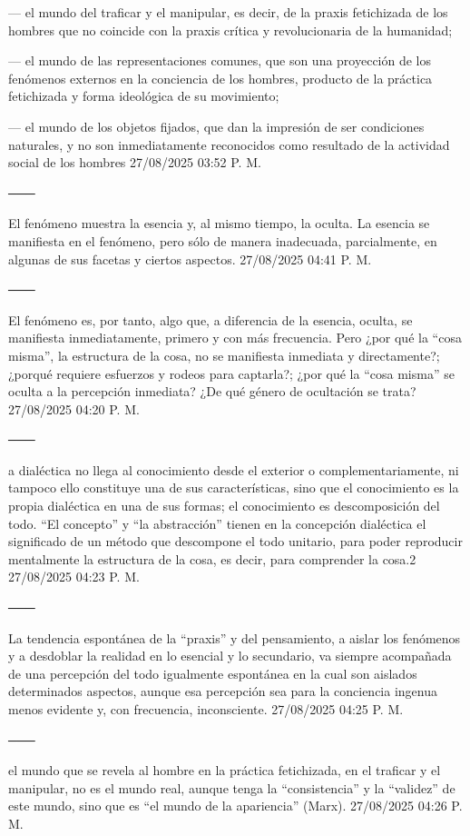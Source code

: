 \documentclass[
  letterpaper,
  DIV=11,
  numbers=noendperiod]{scrreprt}
\begin{document}
--- el mundo del traficar y el manipular, es decir, de la praxis
fetichizada de los hombres que no coincide con la praxis crítica y
revolucionaria de la humanidad;

--- el mundo de las representaciones comunes, que son una proyección de
los fenómenos externos en la conciencia de los hombres, producto de la
práctica fetichizada y forma ideológica de su movimiento;

--- el mundo de los objetos fijados, que dan la impresión de ser
condiciones naturales, y no son inmediatamente reconocidos como
resultado de la actividad social de los hombres 27/08/2025 03:52 P. M.

───

El fenómeno muestra la esencia y, al mismo tiempo, la oculta. La esencia
se manifiesta en el fenómeno, pero sólo de manera inadecuada,
parcialmente, en algunas de sus facetas y ciertos aspectos. 27/08/2025
04:41 P. M.

───

El fenómeno es, por tanto, algo que, a diferencia de la esencia, oculta,
se manifiesta inmediatamente, primero y con más frecuencia. Pero ¿por
qué la ``cosa misma'', la estructura de la cosa, no se manifiesta
inmediata y directamente?; ¿porqué requiere esfuerzos y rodeos para
captarla?; ¿por qué la ``cosa misma'' se oculta a la percepción
inmediata? ¿De qué género de ocultación se trata? 27/08/2025 04:20 P. M.

───

a dialéctica no llega al conocimiento desde el exterior o
complementariamente, ni tampoco ello constituye una de sus
características, sino que el conocimiento es la propia dialéctica en una
de sus formas; el conocimiento es descomposición del todo. ``El
concepto'' y ``la abstracción'' tienen en la concepción dialéctica el
significado de un método que descompone el todo unitario, para poder
reproducir mentalmente la estructura de la cosa, es decir, para
comprender la cosa.2 27/08/2025 04:23 P. M.

───

La tendencia espontánea de la ``praxis'' y del pensamiento, a aislar los
fenómenos y a desdoblar la realidad en lo esencial y lo secundario, va
siempre acompañada de una percepción del todo igualmente espontánea en
la cual son aislados determinados aspectos, aunque esa percepción sea
para la conciencia ingenua menos evidente y, con frecuencia,
inconsciente. 27/08/2025 04:25 P. M.

───

el mundo que se revela al hombre en la práctica fetichizada, en el
traficar y el manipular, no es el mundo real, aunque tenga la
``consistencia'' y la ``validez'' de este mundo, sino que es ``el mundo
de la apariencia'' (Marx). 27/08/2025 04:26 P. M.
\end{document}
